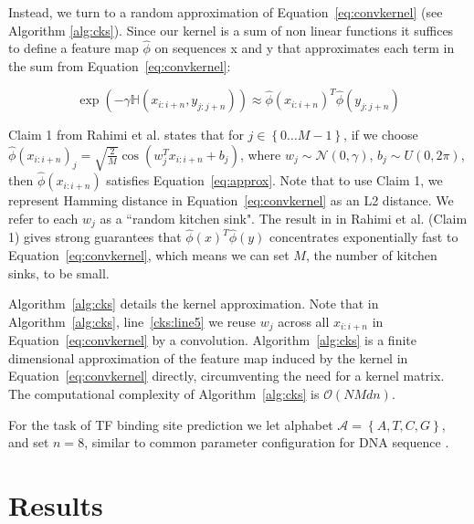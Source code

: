 \documentclass{article}
\begin{document}
Instead, we turn to a random approximation of Equation~\ref{eq:convkernel} (see Algorithm \ref{alg:cks}).
Since our kernel is a sum of non linear functions it suffices to define a feature map $\hat{\phi}$ on sequences x and y that approximates each term in the sum from Equation~\ref{eq:convkernel}:

\vspace{-0.4cm}
\begin{equation}
\label{eq:approx}
\exp(-\gamma \mathds{H}(x_{i:i+n}, y_{j:j+n})) \approx \hat{\phi}(x_{i:i+n})^{T}\hat{\phi}(y_{j:j+n})
\end{equation}

Claim 1 from Rahimi et al. \cite{rahimi2007random} states that for $j \in \left\{0 \ldots M - 1\right\}$, if we choose $\hat{\phi}(x_{i:i+n})_{j} = \sqrt{\frac{2}{M}} \cos(w_{j}^{T}x_{i:i+n} + b_{j})$, where $w_{j} \sim \mathcal{N}(0, \gamma)$, $b_{j} \sim U(0, 2\pi)$, then $\hat{\phi}(x_{i:i+n})$ satisfies Equation~\ref{eq:approx}.
Note that to use Claim 1, we represent Hamming distance in Equation~\ref{eq:convkernel} as an L2 distance. We refer to each $w_{j}$ as a ``random kitchen sink".
The result in in Rahimi et al. \cite{rahimi2007random} (Claim 1) gives strong guarantees that $\hat{\phi}(x)^{T}\hat{\phi}(y)$ concentrates exponentially fast to Equation~\ref{eq:convkernel}, which means we can set $M$, the number of kitchen sinks, to be small.

Algorithm~\ref{alg:cks} details the kernel approximation. Note that in Algorithm~\ref{alg:cks}, line~\ref{cks:line5} we reuse
$w_{j}$ across all $x_{i:i+n}$ in Equation~\ref{eq:convkernel} by a convolution.
Algorithm~\ref{alg:cks} is a finite dimensional approximation of the feature map induced by the kernel in Equation~\ref{eq:convkernel} directly,
circumventing the need for a kernel matrix.
The computational complexity of Algorithm~\ref{alg:cks} is $\mathcal{O}(NMdn)$.

For the task of TF binding site prediction we let alphabet $\mathcal{A} = \left\{A,T,C,G\right\}$, and set $n=8$, similar to common parameter configuration for DNA sequence \cite{fletez2013kmer, alipanahi2015predicting, ghandi2014enhanced}.


\section{Results}
\end{document}
